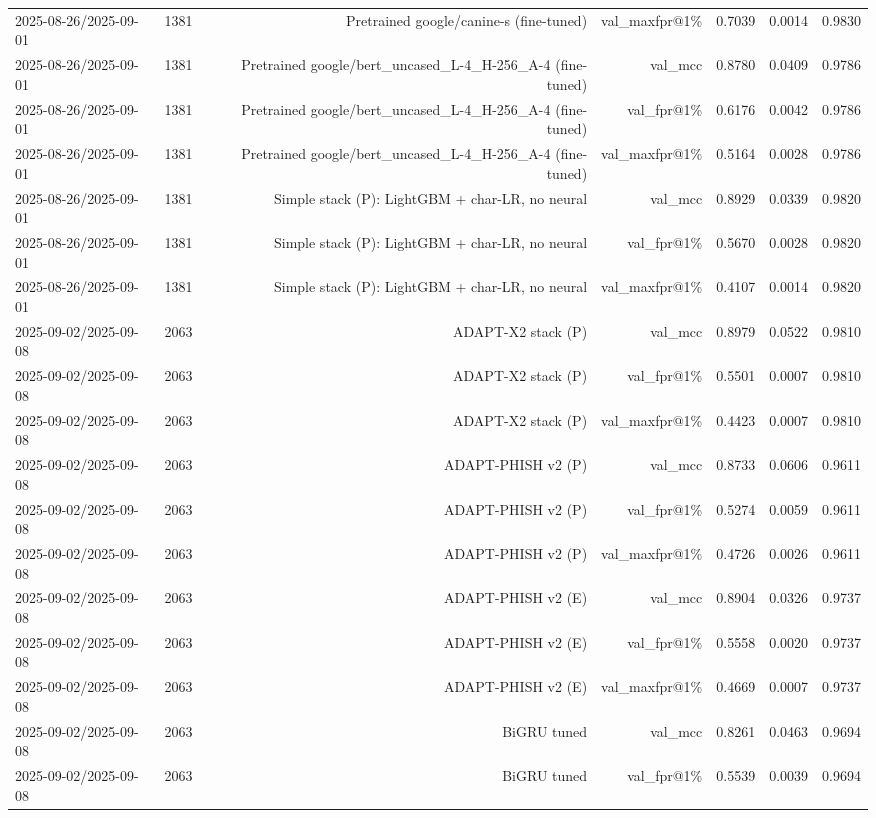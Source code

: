 \begin{table}[t]
\begin{tabular}{llrrrrr}
2025-08-26/2025-09-01 & 1381 & Pretrained google/canine-s (fine-tuned) & val\_maxfpr@1\% & 0.7039 & 0.0014 & 0.9830 \\
2025-08-26/2025-09-01 & 1381 & Pretrained google/bert\_uncased\_L-4\_H-256\_A-4 (fine-tuned) & val\_mcc & 0.8780 & 0.0409 & 0.9786 \\
2025-08-26/2025-09-01 & 1381 & Pretrained google/bert\_uncased\_L-4\_H-256\_A-4 (fine-tuned) & val\_fpr@1\% & 0.6176 & 0.0042 & 0.9786 \\
2025-08-26/2025-09-01 & 1381 & Pretrained google/bert\_uncased\_L-4\_H-256\_A-4 (fine-tuned) & val\_maxfpr@1\% & 0.5164 & 0.0028 & 0.9786 \\
2025-08-26/2025-09-01 & 1381 & Simple stack (P): LightGBM + char-LR, no neural & val\_mcc & 0.8929 & 0.0339 & 0.9820 \\
2025-08-26/2025-09-01 & 1381 & Simple stack (P): LightGBM + char-LR, no neural & val\_fpr@1\% & 0.5670 & 0.0028 & 0.9820 \\
2025-08-26/2025-09-01 & 1381 & Simple stack (P): LightGBM + char-LR, no neural & val\_maxfpr@1\% & 0.4107 & 0.0014 & 0.9820 \\
2025-09-02/2025-09-08 & 2063 & ADAPT-X2 stack (P) & val\_mcc & 0.8979 & 0.0522 & 0.9810 \\
2025-09-02/2025-09-08 & 2063 & ADAPT-X2 stack (P) & val\_fpr@1\% & 0.5501 & 0.0007 & 0.9810 \\
2025-09-02/2025-09-08 & 2063 & ADAPT-X2 stack (P) & val\_maxfpr@1\% & 0.4423 & 0.0007 & 0.9810 \\
2025-09-02/2025-09-08 & 2063 & ADAPT-PHISH v2 (P) & val\_mcc & 0.8733 & 0.0606 & 0.9611 \\
2025-09-02/2025-09-08 & 2063 & ADAPT-PHISH v2 (P) & val\_fpr@1\% & 0.5274 & 0.0059 & 0.9611 \\
2025-09-02/2025-09-08 & 2063 & ADAPT-PHISH v2 (P) & val\_maxfpr@1\% & 0.4726 & 0.0026 & 0.9611 \\
2025-09-02/2025-09-08 & 2063 & ADAPT-PHISH v2 (E) & val\_mcc & 0.8904 & 0.0326 & 0.9737 \\
2025-09-02/2025-09-08 & 2063 & ADAPT-PHISH v2 (E) & val\_fpr@1\% & 0.5558 & 0.0020 & 0.9737 \\
2025-09-02/2025-09-08 & 2063 & ADAPT-PHISH v2 (E) & val\_maxfpr@1\% & 0.4669 & 0.0007 & 0.9737 \\
2025-09-02/2025-09-08 & 2063 & BiGRU tuned & val\_mcc & 0.8261 & 0.0463 & 0.9694 \\
2025-09-02/2025-09-08 & 2063 & BiGRU tuned & val\_fpr@1\% & 0.5539 & 0.0039 & 0.9694 \\

\end{tabular}
\end{table}
